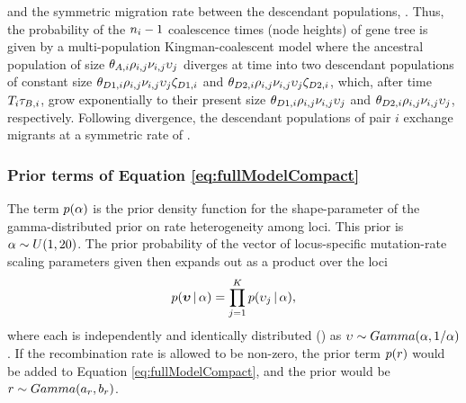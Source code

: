 \begin{linenomath}
and the symmetric migration rate between the descendant populations,
\migrationRate{}.
Thus, the probability of the $\popSampleSize{i}{}-1$ coalescence times (node
heights) of gene tree  is given by a multi-population
Kingman-coalescent model \citep{Kingman1982} where the ancestral population of
size
$\ancestralTheta{i}\ploidyScalar{i}{j}\mutationRateScalarConstant{i}{j}\locusMutationRateScalar{j}$
diverges at time  into two descendant populations of constant
size
$\descendantTheta{1}{i}\ploidyScalar{i}{j}\mutationRateScalarConstant{i}{j}\locusMutationRateScalar{j}\bottleScalar{1}{i}$
and
$\descendantTheta{2}{i}\ploidyScalar{i}{j}\mutationRateScalarConstant{i}{j}\locusMutationRateScalar{j}\bottleScalar{2}{i}$,
which, after time $\divTimeMap{i}\bottleTime{i}$, grow exponentially to their
present size 
$\descendantTheta{1}{i}\ploidyScalar{i}{j}\mutationRateScalarConstant{i}{j}\locusMutationRateScalar{j}$
and
$\descendantTheta{2}{i}\ploidyScalar{i}{j}\mutationRateScalarConstant{i}{j}\locusMutationRateScalar{j}$,
respectively.
Following divergence, the descendant populations of pair $i$ exchange migrants at a symmetric rate of
.
\end{linenomath}


\subsubsection{Prior terms of Equation \ref{eq:fullModelCompact}}
\begin{linenomath}
The term $p(\alpha)$ is the prior density
function for the shape-parameter of the gamma-distributed prior on
rate heterogeneity among loci.
This prior is $\alpha \sim U(1, 20)$.
The prior probability of the vector of locus-specific mutation-rate scaling parameters
given \locusRateHetShapeParameter then expands out as a product over
the loci
\begin{equation}
    p(\boldsymbol{\upsilon} \,|\, \alpha) =
    \prod_{j=1}^{K}
    p(\upsilon_{j} \,|\, \alpha),
    \label{eq:locusRateHetPrior}
\end{equation}
where each \locusMutationRateScalar{} is independently and identically
distributed (\iid) as
$\upsilon_{} \sim Gamma(\alpha,
1/\alpha)$.
If the recombination rate \recombinationRate is allowed to be
non-zero, the prior term $p(r)$ would be added
to Equation \ref{eq:fullModelCompact}, and the prior would be
$r \sim Gamma(a_{r},
b_{r})$.
\end{linenomath}

